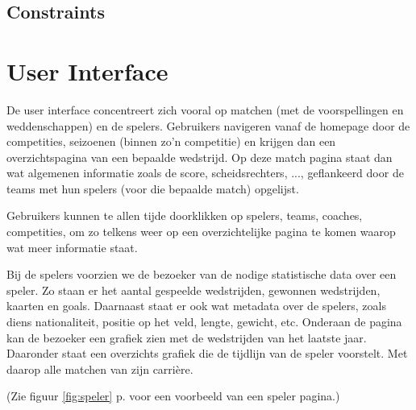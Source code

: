 \documentclass[11pt]{article}
\begin{document}
\subsection{Constraints}





\section{User Interface}


De user interface concentreert zich vooral op matchen (met de voorspellingen en weddenschappen) en de spelers.
Gebruikers navigeren vanaf de homepage door de competities, seizoenen (binnen zo'n competitie) en krijgen dan een overzichtspagina van een bepaalde wedstrijd.
Op deze match pagina staat dan wat algemenen informatie zoals de score, scheidsrechters, ..., geflankeerd door de teams met hun spelers (voor die bepaalde match) opgelijst.

Gebruikers kunnen te allen tijde doorklikken op spelers, teams, coaches, competities, om zo telkens weer op een overzichtelijke pagina te komen waarop wat meer informatie staat.

Bij de spelers voorzien we de bezoeker van de nodige statistische data over een speler. Zo staan er het aantal gespeelde wedstrijden, gewonnen wedstrijden, kaarten en goals. Daarnaast staat er ook wat metadata over de spelers, zoals diens nationaliteit, positie op het veld, lengte, gewicht, etc.
Onderaan de pagina kan de bezoeker een grafiek zien met de wedstrijden van het laatste jaar. Daaronder staat een overzichts grafiek die de tijdlijn van de speler voorstelt. Met daarop alle matchen van zijn carri\`ere.

(Zie figuur \ref{fig:speler} p. \pageref{fig:speler} voor een voorbeeld van een speler pagina.)\\
\end{document}
